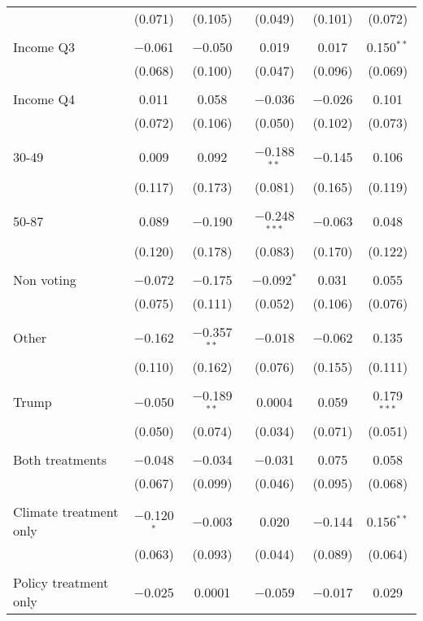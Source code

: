 \begin{tabular}{@{\extracolsep{5pt}}lccccc}
  & (0.071) & (0.105) & (0.049) & (0.101) & (0.072) \\ 
  & & & & & \\ 
 Income Q3 & $-$0.061 & $-$0.050 & 0.019 & 0.017 & 0.150$^{**}$ \\ 
  & (0.068) & (0.100) & (0.047) & (0.096) & (0.069) \\ 
  & & & & & \\ 
 Income Q4 & 0.011 & 0.058 & $-$0.036 & $-$0.026 & 0.101 \\ 
  & (0.072) & (0.106) & (0.050) & (0.102) & (0.073) \\ 
  & & & & & \\ 
 30-49 & 0.009 & 0.092 & $-$0.188$^{**}$ & $-$0.145 & 0.106 \\ 
  & (0.117) & (0.173) & (0.081) & (0.165) & (0.119) \\ 
  & & & & & \\ 
 50-87 & 0.089 & $-$0.190 & $-$0.248$^{***}$ & $-$0.063 & 0.048 \\ 
  & (0.120) & (0.178) & (0.083) & (0.170) & (0.122) \\ 
  & & & & & \\ 
 Non voting & $-$0.072 & $-$0.175 & $-$0.092$^{*}$ & 0.031 & 0.055 \\ 
  & (0.075) & (0.111) & (0.052) & (0.106) & (0.076) \\ 
  & & & & & \\ 
 Other & $-$0.162 & $-$0.357$^{**}$ & $-$0.018 & $-$0.062 & 0.135 \\ 
  & (0.110) & (0.162) & (0.076) & (0.155) & (0.111) \\ 
  & & & & & \\ 
 Trump & $-$0.050 & $-$0.189$^{**}$ & 0.0004 & 0.059 & 0.179$^{***}$ \\ 
  & (0.050) & (0.074) & (0.034) & (0.071) & (0.051) \\ 
  & & & & & \\ 
 Both treatments & $-$0.048 & $-$0.034 & $-$0.031 & 0.075 & 0.058 \\ 
  & (0.067) & (0.099) & (0.046) & (0.095) & (0.068) \\ 
  & & & & & \\ 
 Climate treatment only & $-$0.120$^{*}$ & $-$0.003 & 0.020 & $-$0.144 & 0.156$^{**}$ \\ 
  & (0.063) & (0.093) & (0.044) & (0.089) & (0.064) \\ 
  & & & & & \\ 
 Policy treatment only & $-$0.025 & 0.0001 & $-$0.059 & $-$0.017 & 0.029 \\ 

\end{tabular}
